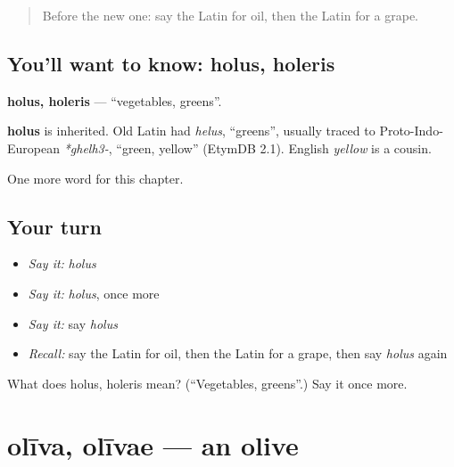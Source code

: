 \label{lesson:LA-C80-holus}



\begin{quote}
Before the new one: say the Latin for oil, then the Latin for a grape.
\end{quote}

\subsection*{You'll want to know: holus, holeris}
\textbf{holus, holeris} — \textquotedblleft{}vegetables, greens\textquotedblright{}.

\begin{cousinweb}
\textbf{holus} is inherited. Old Latin had \emph{helus}, \textquotedblleft{}greens\textquotedblright{}, usually traced to Proto-Indo-European \emph{*ghelh3-}, \textquotedblleft{}green, yellow\textquotedblright{} (EtymDB 2.1). English \emph{yellow} is a cousin.
\end{cousinweb}

\begin{grammarlens}[title={What you've built}]
One more word for this chapter.
\end{grammarlens}

\subsection*{Your turn}
\begin{itemize}
\raggedright
  \item \emph{Say it:} \emph{holus}
  \item \emph{Say it:} \emph{holus}, once more
  \item \emph{Say it:} say \emph{holus}
  \item \emph{Recall:} say the Latin for oil, then the Latin for a grape, then say \emph{holus} again
\end{itemize}

\begin{tcolorbox}[breakable,colback=teal!4,colframe=teal!35!black,title={Before you move on}]
What does holus, holeris mean? (\textquotedblleft{}Vegetables, greens\textquotedblright{}.) Say it once more.
\end{tcolorbox}
\section[olīva, olīvae]{olīva, olīvae — an olive}

\label{lesson:LA-C80-oliva}



